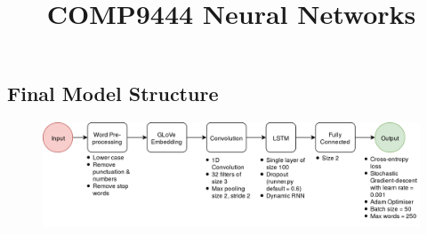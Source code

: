 \documentclass[a4paper,12pt]{article}
\title{COMP9444 Neural Networks}
\date{}
\begin{document}
\subsection*{Final Model Structure}

\begin{figure}[h]
\begin{center}
\includegraphics[width=\linewidth]{diagram.png}
\end{center}
\end{figure}
\end{document}
